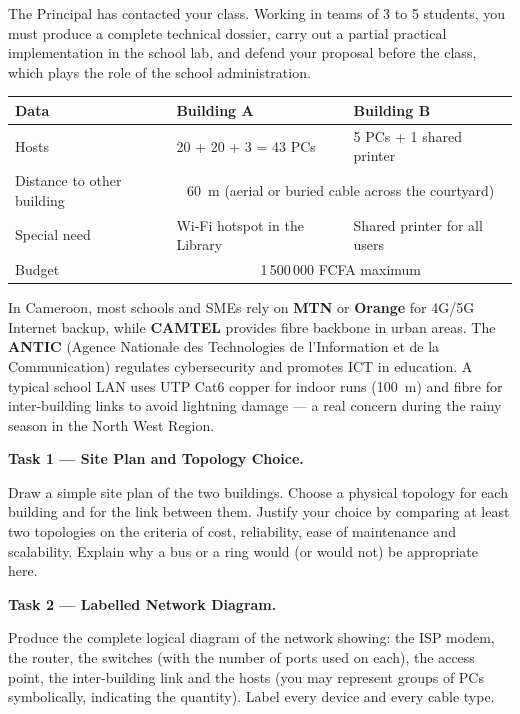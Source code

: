 \documentclass[11pt]{article}
\newcounter{popsec}
\newcounter{popsub}
\newcommand{\courssub}[1]{%
  \stepcounter{popsub}%
  \par\vspace{9pt}\noindent{\popxbold\fontsize{11.5}{13}\selectfont\color{popink}{\color{poporange}\thepopsec.\thepopsub}\hspace{6pt}#1}\par\nopagebreak\vspace{4pt}
}
\begin{document}
The Principal has contacted your class. Working in teams of 3 to 5 students, you must produce a complete technical dossier, carry out a partial practical implementation in the school lab, and defend your proposal before the class, which plays the role of the school administration.

\begin{center}
\begin{tabularx}{\linewidth}{|l|X|X|}\hline
\rowcolor{popblueL} \textbf{Data} & \textbf{Building A} & \textbf{Building B} \\ \hline
Hosts & 20 + 20 + 3 = 43 PCs & 5 PCs + 1 shared printer \\ \hline
Distance to other building & \multicolumn{2}{c|}{\SI{60}{m} (aerial or buried cable across the courtyard)} \\ \hline
Special need & Wi-Fi hotspot in the Library & Shared printer for all users \\ \hline
Budget & \multicolumn{2}{c|}{1\,500\,000 FCFA maximum} \\ \hline
\end{tabularx}
\end{center}

\begin{savaistu}
In Cameroon, most schools and SMEs rely on \textbf{MTN} or \textbf{Orange} for 4G/5G Internet backup, while \textbf{CAMTEL} provides fibre backbone in urban areas. The \textbf{ANTIC} (Agence Nationale des Technologies de l'Information et de la Communication) regulates cybersecurity and promotes ICT in education. A typical school LAN uses UTP Cat6 copper for indoor runs (\le \SI{100}{m}) and fibre for inter-building links to avoid lightning damage — a real concern during the rainy season in the North West Region.
\end{savaistu}

\courssub{Tasks}

\textbf{Task 1 — Site Plan and Topology Choice.}\par
Draw a simple site plan of the two buildings. Choose a physical topology for each building and for the link between them. Justify your choice by comparing at least two topologies on the criteria of cost, reliability, ease of maintenance and scalability. Explain why a bus or a ring would (or would not) be appropriate here.

\textbf{Task 2 — Labelled Network Diagram.}\par
Produce the complete logical diagram of the network showing: the ISP modem, the router, the switches (with the number of ports used on each), the access point, the inter-building link and the hosts (you may represent groups of PCs symbolically, indicating the quantity). Label every device and every cable type.
\end{document}
